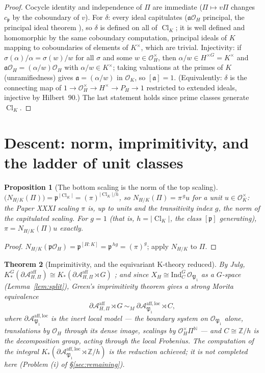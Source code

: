 \documentclass[11pt]{amsart}
\newtheorem{theorem}{Theorem}[section]
\newtheorem{proposition}[theorem]{Proposition}
\theoremstyle{remark}
\newcommand{\OK}{\mathcal{O}_K}
\newcommand{\OH}{\mathcal{O}_H}
\newcommand{\pp}{\mathfrak{p}}
\newcommand{\PP}{\mathfrak{P}}
\newcommand{\Z}{\mathbb{Z}}
\newcommand{\N}{\mathbb{N}}
\newcommand{\Cl}{\operatorname{Cl}}
\newcommand{\Aaff}{\mathcal{A}^{\mathrm{aff}}}
\newcommand{\Aloc}{\mathcal{A}^{\mathrm{aff},\mathrm{loc}}}
\begin{document}
\begin{proof}
Cocycle identity and independence of $\Pi$ are immediate ($\Pi\mapsto v\Pi$ changes
$c_\pp$ by the coboundary of $v$). For $\delta$: every ideal capitulates
($\mathfrak a\OH$ principal, the principal ideal theorem \cite[VI.7]{Neukirch}), so
$\delta$ is defined on all of $\Cl_K$; it is well defined and homomorphic by the same
coboundary computation, principal ideals of $K$ mapping to coboundaries of elements of
$K^\times$, which are trivial. Injectivity: if $\sigma(\alpha)/\alpha=\sigma(w)/w$ for
all $\sigma$ and some $w\in\OH^\times$, then $\alpha/w\in H^{\times G}=K^\times$ and
$\mathfrak a\OH=(\alpha/w)\OH$ with $\alpha/w\in K^\times$; taking valuations at the
primes of $K$ (unramifiedness) gives $\mathfrak a=(\alpha/w)$ in $\OK$, so
$[\mathfrak a]=1$. (Equivalently: $\delta$ is the connecting map of
$1\to\OH^\times\to H^\times\to P_H\to1$ restricted to extended ideals, injective by
Hilbert~90.) The last statement holds since prime classes generate $\Cl_K$.
\end{proof}

\section{Descent: norm, imprimitivity, and the ladder of unit classes}\label{sec:descent}

\begin{proposition}[The bottom scaling is the norm of the top scaling]\label{prop:norm}
$\bigl(N_{H/K}(\Pi)\bigr)=\pp^{\,|\Cl_K|}=(\pi)^{|\Cl_K|/h}$, so
$N_{H/K}(\Pi)=\pi^{\,g}u$ for a unit $u\in\OK^\times$: the Paper XXXI scaling $\pi$ is,
up to units and the transitivity index $g$, the norm of the capitulated scaling.
For $g=1$ (that is, $h=|\Cl_K|$, the class $[\pp]$ generating), $\pi=N_{H/K}(\Pi)u$
exactly.
\end{proposition}

\begin{proof}
$N_{H/K}(\pp\OH)=\pp^{[H:K]}=\pp^{\,hg}=(\pi)^g$; apply $N_{H/K}$ to $\Pi$.
\end{proof}

\begin{theorem}[Imprimitivity, and the equivariant K-theory reduced]\label{thm:imprimitivity}
By Julg, $K_*^G(\partial\Aaff_{H,\Pi})\cong K_*(\partial\Aaff_{H,\Pi}\rtimes G)$
\cite{Julg}; and since $X_H\cong\mathrm{Ind}_C^G\,\mathcal O_{\PP_1}$ as a $G$-space
(Lemma~\ref{lem:split}), Green's imprimitivity theorem \cite{Green} gives a strong Morita
equivalence
\[
\partial\Aaff_{H,\Pi}\rtimes G\ \sim_{M}\
\partial\Aloc_{\PP_1}\rtimes C,
\]
where $\partial\Aloc_{\PP_1}$ is the inert local model --- the boundary
system on $\mathcal O_{\PP_1}$ alone, translations by $\OH$ through its dense image,
scalings by $\OH^\times\Pi^{\N}$ --- and $C\cong\Z/h$ is the decomposition group,
acting through the local Frobenius. The computation of the integral
$K_*(\partial\Aloc_{\PP_1}\rtimes\Z/h)$ is the reduction achieved; it is
not completed here (Problem (i) of \S\ref{sec:remaining}).
\end{theorem}
\end{document}
